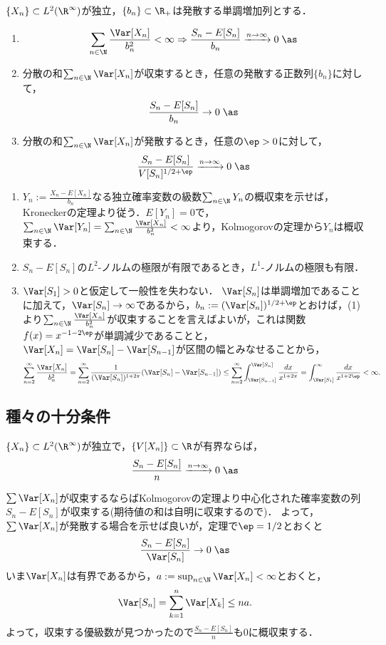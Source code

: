 \documentclass[uplatex,dvipdfmx]{jsreport}
\begin{document}
\begin{theorem}[大数の法則]
    $\{X_n\}\subset L^2(\R^\infty)$が独立，$\{b_n\}\subset\R_+$は発散する単調増加列とする．
    \begin{enumerate}
        \item 
        \[\sum_{n\in\N}\frac{\Var[X_n]}{b_n^2}<\infty\Rightarrow\frac{S_n-E[S_n]}{b_n}\xrightarrow{n\to\infty}0\;\as\]
        \item 分散の和$\sum_{n\in\N}\Var[X_n]$が収束するとき，任意の発散する正数列$\{b_n\}$に対して，
        \[\frac{S_n-E[S_n]}{b_n}\to0\;\as\]
        \item 分散の和$\sum_{n\in\N}\Var[X_n]$が発散するとき，任意の$\ep>0$に対して，
        \[\frac{S_n-E[S_n]}{V[S_n]^{1/2+\ep}}\xrightarrow{n\to\infty}0\;\as\]
    \end{enumerate}
\end{theorem}
\begin{Proof}\mbox{}
    \begin{enumerate}
        \item $Y_n:=\frac{X_n-E[X_n]}{b_n}$なる独立確率変数の級数$\sum_{n\in\N}Y_n$の概収束を示せば，Kroneckerの定理より従う．$E[Y_n]=0$で，$\sum_{n\in\N}\Var[Y_n]=\sum_{n\in\N}\frac{\Var[X_n]}{b_n^2}<\infty$より，Kolmogorovの定理から$Y_n$は概収束する．
        \item $S_n-E[S_n]$の$L^2$-ノルムの極限が有限であるとき，$L^1$-ノルムの極限も有限．
        \item $\Var[S_1]>0$と仮定して一般性を失わない．
        $\Var[S_n]$は単調増加であることに加えて，$\Var[S_n]\to\infty$であるから，$b_n:=(\Var[S_n])^{1/2+\ep}$とおけば，(1)より$\sum_{n\in\N}\frac{\Var[X_n]}{b_n^2}$が収束することを言えばよいが，これは関数$f(x)=x^{-1-2\ep}$が単調減少であることと，$\Var[X_n]=\Var[S_n]-\Var[S_{n-1}]$が区間の幅とみなせることから，
        \[\sum^\infty_{n=2}\frac{\Var[X_n]}{b_n^2}=\sum^\infty_{n=2}\frac{1}{(\Var[S_n])^{1+2\pi}}(\Var[S_n]-\Var[S_{n-1}])\le\sum^\infty_{n=2}\int^{\Var[S_n]}_{\Var[S_{n-1}]}\frac{dx}{x^{1+2\pi}}=\int^\infty_{\Var[S_1]}\frac{dx}{x^{1+2\ep}}<\infty.\]
    \end{enumerate}
\end{Proof}

\subsection{種々の十分条件}

\begin{corollary}[Kolmogorov]
    $\{X_n\}\subset L^2(\R^\infty)$が独立で，$\{V[X_n]\}\subset\R$が有界ならば，
    \[\frac{S_n-E[S_n]}{n}\xrightarrow{n\to\infty}0\;\as\]
\end{corollary}
\begin{Proof}
    $\sum\Var[X_n]$が収束するならばKolmogorovの定理より中心化された確率変数の列$S_n-E[S_n]$が収束する(期待値の和は自明に収束するので)．
    よって，$\sum\Var[X_n]$が発散する場合を示せば良いが，定理で$\ep=1/2$とおくと
    \[\frac{S_n-E[S_n]}{\Var[S_n]}\to0\;\as\]
    いま$\Var[X_n]$は有界であるから，$a:=\sup_{n\in\N}\Var[X_n]<\infty$とおくと，
    \[\Var[S_n]=\sum_{k=1}^n\Var[X_k]\le na.\]
    よって，収束する優級数が見つかったので$\frac{S_n-E[S_n]}{n}$も$0$に概収束する．
\end{Proof}
\end{document}
